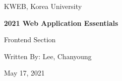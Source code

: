 \begin{titlepage}
    \centering
    \vspace*{35mm}
    \par\vspace{5mm}
    {\large KWEB, Korea University}
    \par\vspace{20mm}
    {\large\bfseries 2021 Web Application Essentials \par\huge Frontend Section}
    \par\vspace{30mm}
    {\large Written By: Lee, Chanyoung}
    \par\vspace{30mm}
    {\large May 17, 2021}
\end{titlepage}
